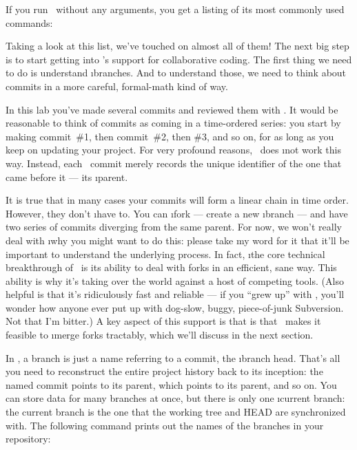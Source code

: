 \documentclass[letterpaper,12pt,titlepage,twoside]{article}
\begin{document}
If you run \git\ without any arguments, you get a listing of its most commonly
used commands:


Taking a look at this list, we've touched on almost all of them! The next big
step is to start getting into \git's support for collaborative coding. The
first thing we need to do is understand \i{branches}. And to understand those,
we need to think about commits in a more careful, formal-math kind of way.

In this lab you've made several commits and reviewed them with . It
would be reasonable to think of commits as coming in a time-ordered series:
you start by making commit~\#1, then commit~\#2, then \#3, and so on, for as
long as you keep on updating your project. For very profound reasons,
\git\ does \i{not} work this way. Instead, each \git\ commit merely records
the unique identifier of the one that came before it --- its \i{parent}.


It is true that in many cases your commits will form a linear chain in time
order. However, they don't \i{have} to. You can \i{fork} --- create a new
\i{branch} --- and have two series of commits diverging from the same parent.
For now, we won't really deal with \i{why} you might want to do this: please
take my word for it that it'll be important to understand the underlying
process. In fact, \i{the core technical breakthrough of \git\ is its ability
  to deal with forks in an efficient, sane way.} This ability is why it's
taking over the world against a host of competing tools. (Also helpful is that
it's ridiculously fast and reliable --- if you ``grew up'' with \git, you'll
wonder how anyone ever put up with dog-slow, buggy, piece-of-junk Subversion.
Not that I'm bitter.) A key aspect of this support is that is that \git\ makes
it feasible to \i{merge} forks tractably, which we'll discuss in the next
section.

In \git, a branch is just a name referring to a commit, the \i{branch head}.
That's all you need to reconstruct the entire project history back to its
inception: the named commit points to its parent, which points to its parent,
and so on. You can store data for many branches at once, but there is only one
\i{current branch}: the current branch is the one that the working tree and
HEAD are synchronized with. The following command prints out the names of the
branches in your repository:
\end{document}
